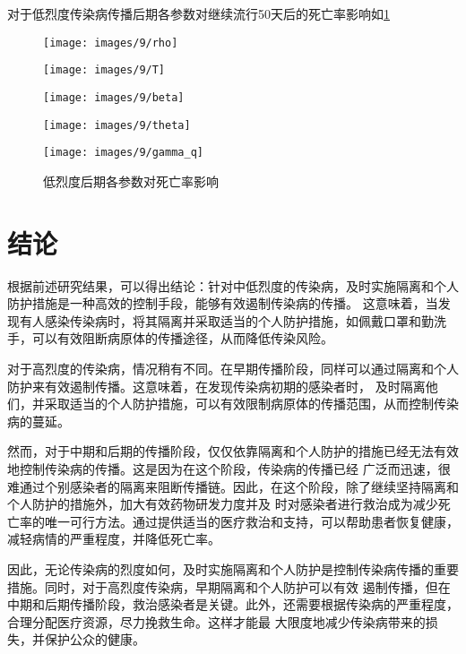 \documentclass[withoutpreface,bwprint]{cumcmthesis}
\begin{document}
对于低烈度传染病传播后期各参数对继续流行50天后的死亡率影响如\cref{fig:14}
\begin{figure}[H]
    \centering
    \begin{minipage}[c]{0.3\textwidth}
        \centering
        \texttt{[image: images/9/rho]}
        \subcaption{$\rho$}
    \end{minipage}
    \begin{minipage}[c]{0.3\textwidth}
        \centering
        \texttt{[image: images/9/T]}
    \end{minipage}
    \begin{minipage}[c]{0.3\textwidth}
        \centering
        \texttt{[image: images/9/beta]}
        \subcaption{$\beta$}
    \end{minipage}

    \begin{minipage}[c]{0.3\textwidth}
        \centering
        \texttt{[image: images/9/theta]}
        \subcaption{$\theta$}
    \end{minipage}
    \begin{minipage}[c]{0.3\textwidth}
        \centering
        \texttt{[image: images/9/gamma\_q]}
    \end{minipage}
    \caption{低烈度后期各参数对死亡率影响}
    \label{fig:14}

\end{figure}


\section{结论}

根据前述研究结果，可以得出结论：针对中低烈度的传染病，及时实施隔离和个人防护措施是一种高效的控制手段，能够有效遏制传染病的传播。
这意味着，当发现有人感染传染病时，将其隔离并采取适当的个人防护措施，如佩戴口罩和勤洗手，可以有效阻断病原体的传播途径，从而降低传染风险。

对于高烈度的传染病，情况稍有不同。在早期传播阶段，同样可以通过隔离和个人防护来有效遏制传播。这意味着，在发现传染病初期的感染者时，
及时隔离他们，并采取适当的个人防护措施，可以有效限制病原体的传播范围，从而控制传染病的蔓延。

然而，对于中期和后期的传播阶段，仅仅依靠隔离和个人防护的措施已经无法有效地控制传染病的传播。这是因为在这个阶段，传染病的传播已经
广泛而迅速，很难通过个别感染者的隔离来阻断传播链。因此，在这个阶段，除了继续坚持隔离和个人防护的措施外，加大有效药物研发力度并及
时对感染者进行救治成为减少死亡率的唯一可行方法。通过提供适当的医疗救治和支持，可以帮助患者恢复健康，减轻病情的严重程度，并降低死亡率。

因此，无论传染病的烈度如何，及时实施隔离和个人防护是控制传染病传播的重要措施。同时，对于高烈度传染病，早期隔离和个人防护可以有效
遏制传播，但在中期和后期传播阶段，救治感染者是关键。此外，还需要根据传染病的严重程度，合理分配医疗资源，尽力挽救生命。这样才能最
大限度地减少传染病带来的损失，并保护公众的健康。
\end{document}
